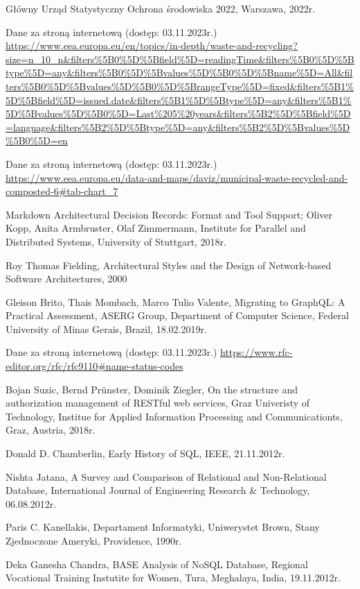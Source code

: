 \documentclass[12pt, a4paper, twoside, openany]{book}
\begin{document}
\begin{enumerate}[label={[}\arabic*{]}]
    \item Główny Urząd Statystyczny Ochrona środowiska 2022, Warszawa, 2022r.
    \item Dane za stroną internetową (dostęp: 03.11.2023r.) \url{https://www.eea.europa.eu/en/topics/in-depth/waste-and-recycling?size=n_10_n&filters%5B0%5D%5Bfield%5D=readingTime&filters%5B0%5D%5Btype%5D=any&filters%5B0%5D%5Bvalues%5D%5B0%5D%5Bname%5D=All&filters%5B0%5D%5Bvalues%5D%5B0%5D%5BrangeType%5D=fixed&filters%5B1%5D%5Bfield%5D=issued.date&filters%5B1%5D%5Btype%5D=any&filters%5B1%5D%5Bvalues%5D%5B0%5D=Last%205%20years&filters%5B2%5D%5Bfield%5D=language&filters%5B2%5D%5Btype%5D=any&filters%5B2%5D%5Bvalues%5D%5B0%5D=en}
    \item Dane za stroną internetową (dostęp: 03.11.2023r.) \url{https://www.eea.europa.eu/data-and-maps/daviz/municipal-waste-recycled-and-composted-6#tab-chart_7}
    \item Markdown Architectural Decision Records: Format and Tool Support; Oliver Kopp, Anita Armbruster, Olaf Zimmermann, Institute for Parallel and Distributed Systems, University of Stuttgart, 2018r.
    \item Roy Thomas Fielding, Architectural Styles and the Design of Network-based Software Architectures, 2000
    \item Gleison Brito, Thais Mombach, Marco Tulio Valente, Migrating to GraphQL: A Practical Assessment, ASERG Group, Department of Computer Science, Federal University of Minas Gerais, Brazil, 18.02.2019r.
    \item Dane za stroną internetową (dostęp: 03.11.2023r.) \url{https://www.rfc-editor.org/rfc/rfc9110#name-status-codes}
    \item Bojan Suzic, Bernd Prünster, Dominik Ziegler, On the structure and authorization management of RESTful web services, Graz Univeristy of Technology, Institue for Applied Information Processing and Communicationts, Graz, Austria, 2018r.
    \item Donald D. Chamberlin, Early History of SQL, IEEE, 21.11.2012r.
    \item Nishta Jatana, A Survey and Comparison of Relational and Non-Relational Database, International Journal of Engineering Research \& Technology, 06.08.2012r.
    \item Paris C. Kanellakis, Departament Informatyki, Uniwerystet Brown, Stany Zjednoczone Ameryki, Providence, 1990r.
    \item Deka Ganesha Chandra, BASE Analysis of NoSQL Database, Regional Vocational Training Instutite for Women, Tura, Meghalaya, India, 19.11.2012r.

\end{enumerate}
\end{document}
